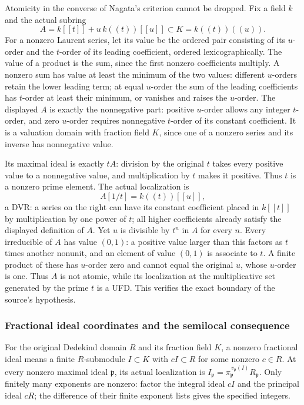 Atomicity in the converse of Nagata's criterion cannot be dropped. Fix a field \(k\) and the actual subring \[
 A=k[[t]]+u\,k((t))[[u]]
 \subset K=k((t))((u)).
\] For a nonzero Laurent series, let its value be the ordered pair consisting of its \(u\)-order and the \(t\)-order of its leading coefficient, ordered lexicographically. The value of a product is the sum, since the first nonzero coefficients multiply. A nonzero sum has value at least the minimum of the two values: different \(u\)-orders retain the lower leading term; at equal \(u\)-order the sum of the leading coefficients has \(t\)-order at least their minimum, or vanishes and raises the \(u\)-order. The displayed \(A\) is exactly the nonnegative part: positive \(u\)-order allows any integer \(t\)-order, and zero \(u\)-order requires nonnegative \(t\)-order of its constant coefficient. It is a valuation domain with fraction field \(K\), since one of a nonzero series and its inverse has nonnegative value.

Its maximal ideal is exactly \(tA\): division by the original \(t\) takes every positive value to a nonnegative value, and multiplication by \(t\) makes it positive. Thus \(t\) is a nonzero prime element. The actual localization is \[
 A[1/t]=k((t))[[u]],
\] a DVR: a series on the right can have its constant coefficient placed in \(k[[t]]\) by multiplication by one power of \(t\); all higher coefficients already satisfy the displayed definition of \(A\). Yet \(u\) is divisible by \(t^n\) in \(A\) for every \(n\). Every irreducible of \(A\) has value \((0,1)\): a positive value larger than this factors as \(t\) times another nonunit, and an element of value \((0,1)\) is associate to \(t\). A finite product of these has \(u\)-order zero and cannot equal the original \(u\), whose \(u\)-order is one. Thus \(A\) is not atomic, while its localization at the multiplicative set generated by the prime \(t\) is a UFD. This verifies the exact boundary of the source's hypothesis.

\subsubsection{Fractional ideal coordinates and the semilocal consequence}\label{fractional-ideal-coordinates-and-the-semilocal-consequence}

For the original Dedekind domain \(R\) and its fraction field \(K\), a nonzero fractional ideal means a finite \(R\)-submodule \(I\subset K\) with \(cI\subset R\) for some nonzero \(c\in R\). At every nonzero maximal ideal \(\mathfrak p\), its actual localization is \(I_{\mathfrak p}=\pi_{\mathfrak p}^{\,v_{\mathfrak p}(I)}R_{\mathfrak p}\). Only finitely many exponents are nonzero: factor the integral ideal \(cI\) and the principal ideal \(cR\); the difference of their finite exponent lists gives the specified integers.

